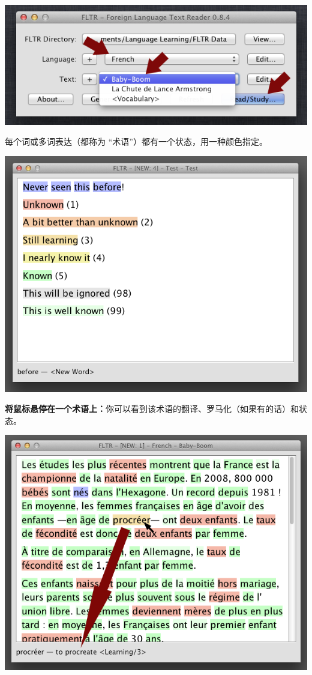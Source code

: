 \documentclass[cn,10pt,math=newtx,citestyle=gb7714-2015,bibstyle=gb7714-2015]{elegantbook}
\begin{document}
\includegraphics[scale=0.6]{image/images-039.png}

每个词或多词表达（都称为 “术语”）都有一个状态，用一种颜色指定。

\includegraphics[scale=0.6]{image/images-041.png}

\textbf{将鼠标悬停在一个术语上：}你可以看到该术语的翻译、罗马化（如果有的话）和状态。

\includegraphics[scale=0.6]{image/images-042.png}
\end{document}
